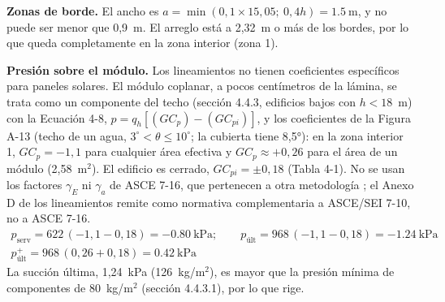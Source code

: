 \documentclass[12pt]{article}
\begin{document}
\textbf{Zonas de borde.} El ancho es $a=\min(0{,}1\times15{,}05;\ 0{,}4h)=\SI{1.5}{\meter}$, y no puede ser menor que 0,9~m. El arreglo está a 2,32~m o más de los bordes, por lo que queda completamente en la zona interior (zona 1).

\textbf{Presión sobre el módulo.} Los lineamientos no tienen coeficientes específicos para paneles solares. El módulo coplanar, a pocos centímetros de la lámina, se trata como un componente del techo (sección 4.4.3, edificios bajos con $h<18$~m) con la Ecuación 4-8, $p=q_h[(GC_p)-(GC_{pi})]$, y los coeficientes de la Figura A-13 (techo de un agua, $3^\circ<\theta\leq10^\circ$; la cubierta tiene 8,5°): en la zona interior 1, $GC_p=-1{,}1$ para cualquier área efectiva y $GC_p\approx+0{,}26$ para el área de un módulo (2,58~m$^2$). El edificio es cerrado, $GC_{pi}=\pm0{,}18$ (Tabla 4-1). No se usan los factores $\gamma_E$ ni $\gamma_a$ de ASCE 7-16, que pertenecen a otra metodología \cite{asce7}; el Anexo D de los lineamientos remite como normativa complementaria a ASCE/SEI 7-10, no a ASCE 7-16.
\begin{gather}
p_{\text{serv}}=622\,(-1{,}1-0{,}18)=\SI{-0.80}{\kilo\pascal};\qquad p_{\text{últ}}=968\,(-1{,}1-0{,}18)=\SI{-1.24}{\kilo\pascal}\\
p_{\text{últ}}^{+}=968\,(0{,}26+0{,}18)=\SI{+0.42}{\kilo\pascal}
\end{gather}
La succión última, 1,24~kPa (126~kg/m$^2$), es mayor que la presión mínima de componentes de 80~kg/m$^2$ (sección 4.4.3.1), por lo que rige.
\end{document}
